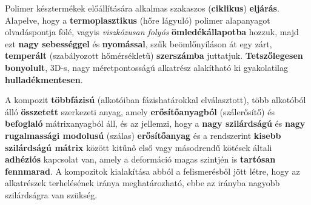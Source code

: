 \documentclass[12pt,a4paper]{article}       %
\begin{document}
\begin{tcbitemize}
  \tcbitem[title={\# \thetcbrasternum{} –
        Mi a fröccsöntés?
      }]
  Polimer késztermékek előállítására alkalmas szakaszos (\textbf{ciklikus})
  \textbf{eljárás}. Alapelve, hogy a \textbf{termoplasztikus} (hőre lágyuló)
  polimer alapanyagot olvadáspontja fölé, vagyis \textit{viszkózusan folyós}
  \textbf{ömledékállapotba} hozzuk, majd ezt \textbf{nagy sebességgel} és
  \textbf{nyomással}, szűk beömlőnyíláson át egy zárt, \textbf{temperált}
  (szabályozott hőmérsékletű) \textbf{szerszámba} juttatjuk. \textbf{
    Tetszőlegesen bonyolult}, 3D-s, nagy méretpontosságú alkatrész
  alakítható ki gyakolatilag \textbf{hulladékmentesen}.



  \tcbitem[title={\# \thetcbrasternum{} –
        Mi a kompozit?
      }]
  A kompozit \textbf{többfázisú} (alkotóiban fázishatárokkal elválasztott),
  több alkotóból álló \textbf{összetett} szerkezeti anyag, amely
  \textbf{erősítőanyagból} (szálerősítő) és \textbf{befoglaló} mátrixanyagból
  áll, és az jellemzi, hogy a \textbf{nagy szilárdságú} és \textbf{nagy
    rugalmassági modolusú} (szálas) \textbf{erősítőanyag} és a rendszerint
  \textbf{kisebb szilárdságú mátrix} között kitűnő első vagy másodrendű kötések
  általi \textbf{adhéziós} kapcsolat van, amely a deformáció magas szintjén is
  \textbf{tartósan fennmarad}. A kompozitok kialakítása abból a felismerésből
  jött létre, hogy az alkatrészek terhelésének iránya meghatározható, ebbe az
  irányba nagyobb szilárdságra van szükség.

\end{tcbitemize}
\end{document}
